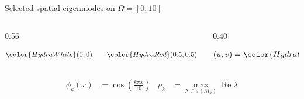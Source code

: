 \begin{frame}{Selected spatial eigenmodes on $\Omega=[0,10]$}

  \vspace{-0.34cm}

  \begin{columns}[c,onlytextwidth]

    \begin{column}{0.56\textwidth}



      {\color{HydraWhite}\fontsize{9.0}{11.4}\selectfont
      \begin{align*}
        {\color{HydraWhite}(0,0)}
        \qquad
        {\color{HydraRed}(0.5,0.5)}
        \qquad
        {\color{HydraGreen}(1,2)}
      \end{align*}
      }
    \end{column}

    \begin{column}{0.40\textwidth}


      \vspace{-0.36cm}

      {\color{HydraWhite}\bfseries\fontsize{9.2}{11.7}\selectfont
      \begin{align*}
        (\bar u,\bar v)={\color{HydraGreen}(1,2)}
      \end{align*}
      }
    \end{column}

  \end{columns}

  \vspace{-0.40cm}

  {\color{HydraWhite}\fontsize{8.8}{11.1}\selectfont
  \begin{align*}
    \phi_k(x)
    &=
    \cos\!\left(\frac{k\pi x}{10}\right)
    &
    \rho_k
    &=
    \max_{\lambda\in\sigma(M_k)}\operatorname{Re}\lambda
  \end{align*}
  }

  \vspace{-0.48cm}

  \begin{columns}[c,onlytextwidth]


\end{columns}
\end{frame}
